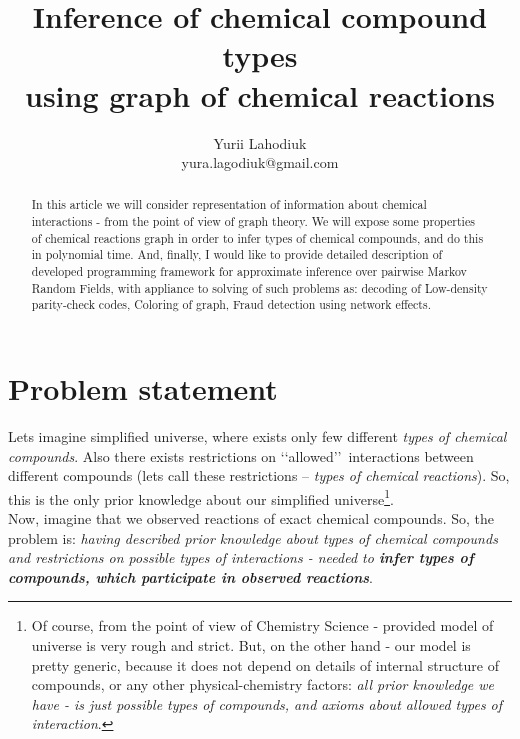 \documentclass[12pt]{article}
\begin{document}
\title{Inference of chemical compound types \\ using graph of chemical reactions}
\author{Yurii Lahodiuk \\ yura.lagodiuk@gmail.com}
\date{}
\maketitle

\begin{abstract}
In this article we will consider representation of information about chemical interactions - from the point of view of graph theory. We will expose some properties of chemical reactions graph in order to infer types of chemical compounds, and do this in polynomial time. And, finally, I would like to provide detailed description of developed programming framework\cite{project_on_github} for approximate inference over pairwise Markov Random Fields, with appliance to solving of such problems as: decoding of Low-density parity-check codes, Coloring of graph, Fraud detection using network effects\cite{fraud_detection}.
\end{abstract}

\section{Problem statement}
Lets imagine simplified universe, where exists only few different \emph{types of chemical compounds}. 
Also there exists restrictions on \lq \lq allowed\rq \rq\ interactions between different compounds (lets call these restrictions -- \emph{types of chemical reactions}).
So, this is the only prior knowledge about our simplified universe\footnote{Of course, from the point of view of Chemistry Science - provided model of universe is very rough and strict. But, on the other hand - our model is pretty generic, because it does not depend on details of internal structure of compounds, or any other physical-chemistry factors: \emph{all prior knowledge we have - is just possible types of compounds, and axioms about allowed types of interaction}.}.\\

Now, imagine that we observed reactions of exact chemical compounds.
So, the problem is: \textsl{having described prior knowledge about types of chemical compounds and restrictions on possible types of interactions - needed to \textbf{infer types of compounds, which participate in observed reactions}}. \\
\end{document}
